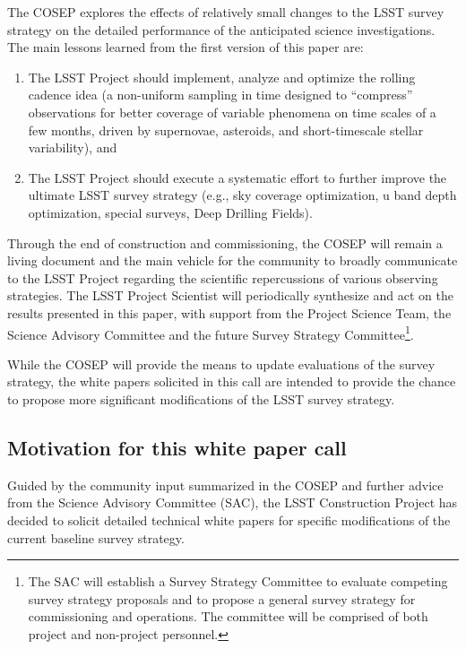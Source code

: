 \documentclass[DM,lsstdraft,toc,usenatbib]{lsstdoc}
\begin{document}
The COSEP explores the effects of relatively small changes to the LSST survey strategy
on the detailed performance of the anticipated science investigations. The main lessons 
learned from the first version of this paper are: 
\begin{enumerate} 
\item The LSST Project should implement, analyze and optimize the rolling cadence idea
(a non-uniform sampling in time designed to ``compress'' observations for better coverage
of variable phenomena on time scales of a few months, driven by supernovae, asteroids, and
short-timescale stellar variability), and 
\item The LSST Project should execute a systematic effort to further improve the ultimate
LSST survey strategy (e.g., sky coverage optimization, u band depth optimization, special 
surveys, Deep Drilling Fields). 
\end{enumerate} 

Through the end of construction and commissioning, the COSEP will remain a living document 
and the main vehicle for the community to broadly communicate to the LSST Project regarding 
the scientific repercussions of various observing strategies. The LSST Project Scientist will 
periodically synthesize and act on the results presented in this paper, with support from the 
Project Science Team, the Science Advisory Committee and the future Survey Strategy 
Committee\footnote{The SAC will establish a Survey 
Strategy Committee to evaluate competing survey strategy proposals and to propose a general survey 
strategy for commissioning and operations. The committee will be comprised of both project and 
non-project personnel.}.

While the COSEP will provide the means to update evaluations of the survey strategy, the white 
papers solicited in this call are intended to provide the chance to propose more significant 
modifications of the LSST survey strategy. 


\subsection{Motivation for this white paper call}

Guided by the community input summarized in the COSEP and further 
advice from the Science Advisory Committee (SAC), the LSST Construction Project has decided to
solicit detailed technical white papers for specific modifications of the current baseline survey strategy.
\end{document}
